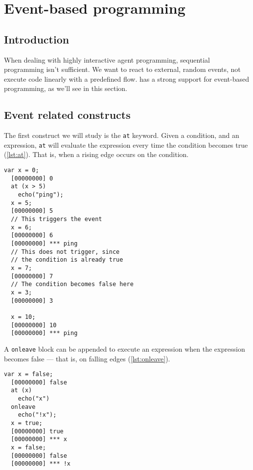 \documentclass[openright,twoside,12pt]{report}
\begin{document}

\chapter{Event-based programming}

\section{Introduction}

When dealing with highly interactive agent programming, sequential
programming isn't sufficient. We want to react to external, random
events, not execute code linearly with a predefined flow. \urbi has a
strong support for event-based programming, as we'll see in this
section.

\section{Event related constructs}

The first construct we will study is the \lstinline|at| keyword. Given
a condition, and an expression, \lstinline|at| will evaluate the
expression every time the condition becomes true (\autoref{lst:at}). That is,
when a rising edge occurs on the condition.

\begin{lstlisting}[caption=Using \texttt{at}, label=lst:at]
  var x = 0;
  [00000000] 0
  at (x > 5)
    echo("ping");
  x = 5;
  [00000000] 5
  // This triggers the event
  x = 6;
  [00000000] 6
  [00000000] *** ping
  // This does not trigger, since
  // the condition is already true
  x = 7;
  [00000000] 7
  // The condition becomes false here
  x = 3;
  [00000000] 3

  x = 10;
  [00000000] 10
  [00000000] *** ping
\end{lstlisting}

A \lstinline|onleave| block can be appended to execute an expression
when the expression becomes false --- that is, on falling edges (\autoref{lst:onleave}).

\begin{lstlisting}[caption=Using \texttt{at ... onleave},
  label=lst:onleave]
  var x = false;
  [00000000] false
  at (x)
    echo("x")
  onleave
    echo("!x");
  x = true;
  [00000000] true
  [00000000] *** x
  x = false;
  [00000000] false
  [00000000] *** !x
\end{lstlisting}
\end{document}
